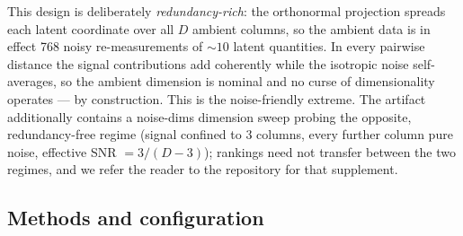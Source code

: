 \documentclass[11pt]{article}
\begin{document}
This design is deliberately \emph{redundancy-rich}: the orthonormal
projection spreads each latent coordinate over all $D$ ambient columns, so
the ambient data is in effect 768 noisy re-measurements of ${\sim}10$ latent
quantities. In every pairwise distance the signal contributions add
coherently while the isotropic noise self-averages, so the ambient dimension
is nominal and no curse of dimensionality operates --- by construction. This
is the noise-friendly extreme. The artifact additionally contains a
noise-dims dimension sweep probing the opposite, redundancy-free regime
(signal confined to 3 columns, every further column pure noise, effective
SNR $= 3/(D{-}3)$); rankings need not transfer between the two regimes, and
we refer the reader to the repository for that supplement.

\subsection{Methods and configuration}
\label{sec:methodsconfig}
\end{document}
